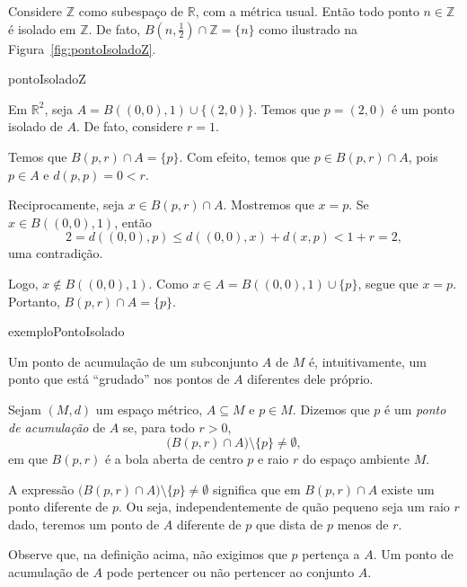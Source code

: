 \begin{example}\label{ex:pontoIsoladoZ}
    Considere $\mathbb Z$ como subespaço de $\mathbb R$, com a métrica usual.
    Então todo ponto $n\in\mathbb Z$ é isolado em $\mathbb Z$.
    De fato, $B\left(n,\frac12\right)\cap\mathbb Z=\{n\}$ como ilustrado na Figura~\ref{fig:pontoIsoladoZ}.
\end{example}

{pontoIsoladoZ}

\begin{example}
    Em $\mathbb R^2$, seja $A = B((0,0), 1)\cup \{(2, 0)\}$.
    Temos que $p=(2, 0)$ é um ponto isolado de $A$.
    De fato, considere $r=1$.
    
    Temos que $B(p, r)\cap A=\{p\}$.
    Com efeito, temos que $p\in B(p, r)\cap A$, pois $p \in A$ e $d(p, p) = 0 < r$.

    Reciprocamente, seja $x \in B(p, r)\cap A$.
    Mostremos que $x=p$.
    Se $x \in B((0,0),1)$, então
    \[
        2=d((0,0),p)\leq d((0,0),x)+d(x,p)<1+r=2,
    \]
    uma contradição.
    
    Logo, $x\notin B((0,0),1)$.
    Como $x\in A=B((0,0),1)\cup\{p\}$, segue que $x=p$.
    Portanto, $B(p,r)\cap A=\{p\}$.
\end{example}

{exemploPontoIsolado}

Um ponto de acumulação de um subconjunto $A$ de $M$ é, intuitivamente, um ponto que está ``grudado'' nos pontos de $A$ diferentes dele próprio.

\begin{definition}
    Sejam $(M,d)$ um espaço métrico, $A\subseteq M$ e $p \in M$.
    Dizemos que $p$ é um \emph{ponto de acumulação} de $A$ se, para todo $r>0$,
    \[
        \bigl(B(p, r)\cap A\bigr)\setminus\{p\}\neq \emptyset,
    \]
    em que $B(p, r)$ é a bola aberta de centro $p$ e raio $r$ do espaço ambiente $M$.
\end{definition}

A expressão $\bigl(B(p, r)\cap A\bigr)\setminus\{p\}\neq\emptyset$ significa que em $B(p, r)\cap A$ existe um ponto diferente de $p$.
Ou seja, independentemente de quão pequeno seja um raio $r$ dado, teremos um ponto de $A$ diferente de $p$ que dista de $p$ menos de $r$.

Observe que, na definição acima, não exigimos que $p$ pertença a $A$.
Um ponto de acumulação de $A$ pode pertencer ou não pertencer ao conjunto $A$.

